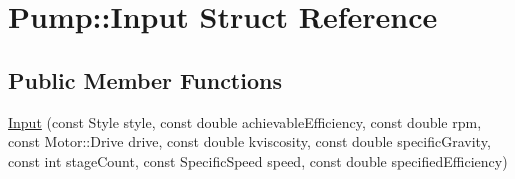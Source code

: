 \hypertarget{struct_pump_1_1_input}{}\section{Pump\+:\+:Input Struct Reference}
\label{struct_pump_1_1_input}
\subsection*{Public Member Functions}
\begin{DoxyCompactItemize}
\item 
\hyperlink{struct_pump_1_1_input_ab79a3ec5697f9a6f6847107b604a8028}{Input} (const Style style, const double achievable\+Efficiency, const double rpm, const Motor\+::\+Drive drive, const double kviscosity, const double specific\+Gravity, const int stage\+Count, const Specific\+Speed speed, const double specified\+Efficiency)
\end{DoxyCompactItemize}
